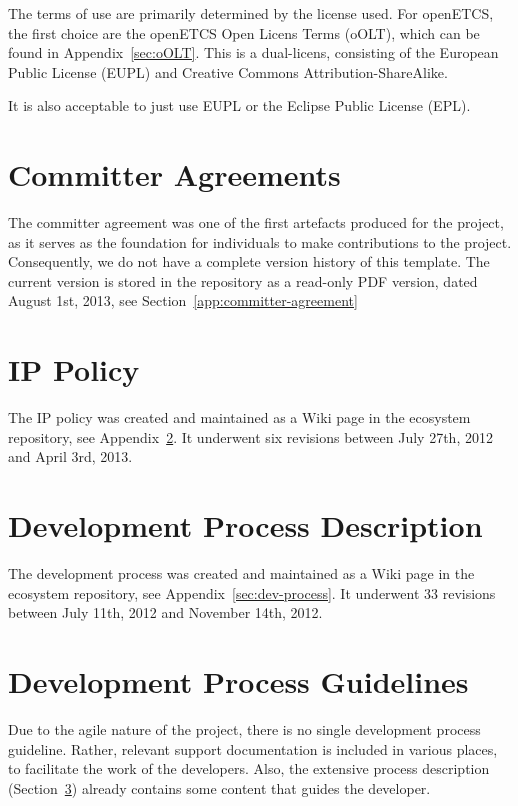 \documentclass{template/openetcs_report}
\begin{document}
The terms of use are primarily determined by the license used.  For openETCS, the first choice are the openETCS Open Licens Terms (oOLT), which can be found in Appendix~\ref{sec:oOLT}. This is a dual-licens, consisting of the European Public License (EUPL) and Creative Commons Attribution-ShareAlike.

It is also acceptable to just use EUPL or the Eclipse Public License (EPL).

\section{Committer Agreements}
\label{sec:committer-agreements}

The committer agreement was one of the first artefacts produced for the project, as it serves as the foundation for individuals to make contributions to the project.  Consequently, we do not have a complete version history of this template.  The current version is stored in the repository as a read-only PDF version, dated August 1st, 2013, see Section~\ref{app:committer-agreement}

\section{IP Policy}
\label{sec:ip-policy}

The IP policy was created and maintained as a Wiki page in the ecosystem repository, see Appendix~\ref{sec:ip-policy}.  It underwent six revisions between July 27th, 2012 and April 3rd, 2013.

\section{Development Process Description}
\label{sec:dev-process-description}

The development process was created and maintained as a Wiki page in the ecosystem repository, see Appendix~\ref{sec:dev-process}.  It underwent 33 revisions between July 11th, 2012 and November 14th, 2012.

\section{Development Process Guidelines}
\label{dev-process-guide}

Due to the agile nature of the project, there is no single development process guideline.  Rather, relevant support documentation is included in various places, to facilitate the work of the developers.  Also, the extensive process description (Section~\ref{sec:dev-process-description}) already contains some content that guides the developer.
\end{document}
